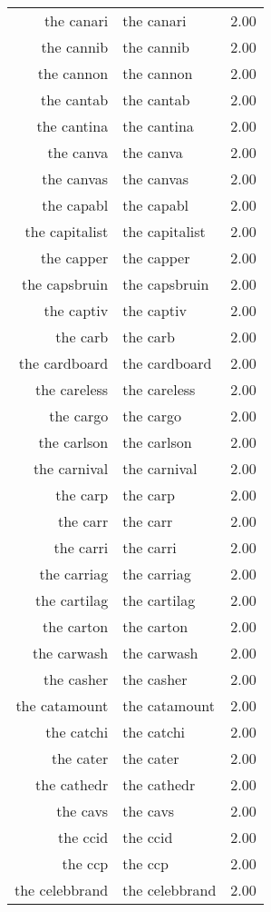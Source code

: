 \begin{table}[ht]
\begin{tabular}{rlr}
  the canari & the canari & 2.00 \\ 
  the cannib & the cannib & 2.00 \\ 
  the cannon & the cannon & 2.00 \\ 
  the cantab & the cantab & 2.00 \\ 
  the cantina & the cantina & 2.00 \\ 
  the canva & the canva & 2.00 \\ 
  the canvas & the canvas & 2.00 \\ 
  the capabl & the capabl & 2.00 \\ 
  the capitalist & the capitalist & 2.00 \\ 
  the capper & the capper & 2.00 \\ 
  the capsbruin & the capsbruin & 2.00 \\ 
  the captiv & the captiv & 2.00 \\ 
  the carb & the carb & 2.00 \\ 
  the cardboard & the cardboard & 2.00 \\ 
  the careless & the careless & 2.00 \\ 
  the cargo & the cargo & 2.00 \\ 
  the carlson & the carlson & 2.00 \\ 
  the carnival & the carnival & 2.00 \\ 
  the carp & the carp & 2.00 \\ 
  the carr & the carr & 2.00 \\ 
  the carri & the carri & 2.00 \\ 
  the carriag & the carriag & 2.00 \\ 
  the cartilag & the cartilag & 2.00 \\ 
  the carton & the carton & 2.00 \\ 
  the carwash & the carwash & 2.00 \\ 
  the casher & the casher & 2.00 \\ 
  the catamount & the catamount & 2.00 \\ 
  the catchi & the catchi & 2.00 \\ 
  the cater & the cater & 2.00 \\ 
  the cathedr & the cathedr & 2.00 \\ 
  the cavs & the cavs & 2.00 \\ 
  the ccid & the ccid & 2.00 \\ 
  the ccp & the ccp & 2.00 \\ 
  the celebbrand & the celebbrand & 2.00 \\ 

\end{tabular}
\end{table}
